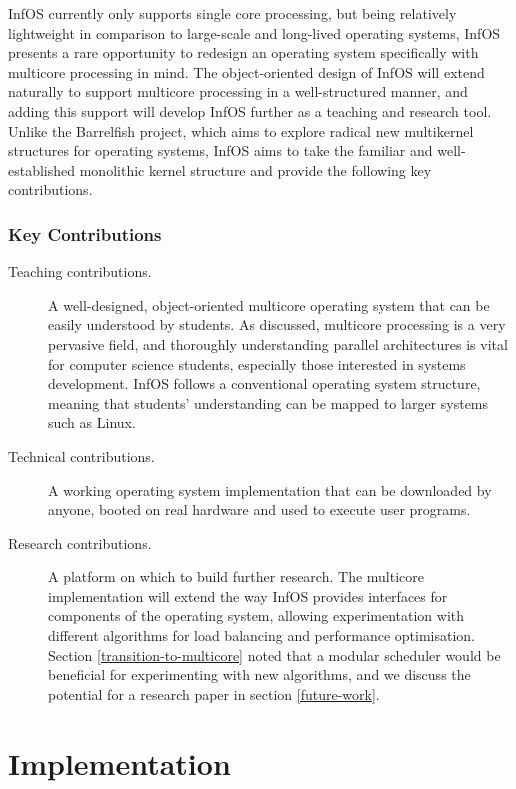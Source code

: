 \documentclass[bsc,frontabs,singlespacing,parskip,deptreport]{infthesis}
\begin{document}
InfOS currently only supports single core processing, but being relatively lightweight in comparison to large-scale and long-lived operating systems, InfOS presents a rare opportunity to redesign an operating system specifically with multicore processing in mind. The object-oriented design of InfOS will extend naturally to support multicore processing in a well-structured manner, and adding this support will develop InfOS further as a teaching and research tool. Unlike the Barrelfish project, which aims to explore radical new multikernel structures for operating systems, InfOS aims to take the familiar and well-established monolithic kernel structure and provide the following key contributions.

\subsection{Key Contributions} \label{key-contributions}
\begin{description}
    \item [Teaching contributions.] A well-designed, object-oriented multicore operating system that can be easily understood by students. As discussed, multicore processing is a very pervasive field, and thoroughly understanding parallel architectures is vital for computer science students, especially those interested in systems development. InfOS follows a conventional operating system structure, meaning that students' understanding can be mapped to larger systems such as Linux.
    \item [Technical contributions.] A working operating system implementation that can be downloaded by anyone, booted on real hardware and used to execute user programs.
    \item [Research contributions.] A platform on which to build further research. The multicore implementation will extend the way InfOS provides interfaces for components of the operating system, allowing experimentation with different algorithms for load balancing and performance optimisation. Section \ref{transition-to-multicore} noted that a modular scheduler would be beneficial for experimenting with new algorithms, and we discuss the potential for a research paper in section \ref{future-work}.
\end{description}

\chapter{Implementation} \label{implementation}
\end{document}
